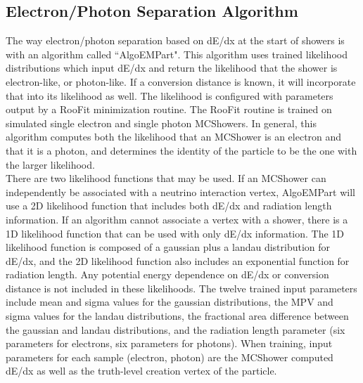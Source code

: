 \subsection{Electron/Photon Separation Algorithm}\label{algoempart_section}
The way electron/photon separation based on dE/dx at the start of showers is with an algorithm called ``AlgoEMPart". This algorithm uses trained likelihood distributions which input dE/dx and return the likelihood that the shower is electron-like, or photon-like. If a conversion distance is known, it will incorporate that into its likelihood as well. The likelihood is configured with parameters output by a RooFit minimization routine. The RooFit routine is trained on simulated single electron and single photon {\sc MCShowers}. In general, this algorithm computes both the likelihood that an {\sc MCShower} is an electron and that it is a photon, and determines the identity of the particle to be the one with the larger likelihood.\\

There are two likelihood functions that may be used. If an {\sc MCShower} can independently be associated with a neutrino interaction vertex, AlgoEMPart will use a 2D likelihood function that includes both dE/dx and radiation length information. If an algorithm cannot associate a vertex with a shower, there is a 1D likelihood function that can be used with only dE/dx information. The 1D likelihood function is composed of a gaussian plus a landau distribution for dE/dx, and the 2D likelihood function also includes an exponential function for radiation length. Any potential energy dependence on dE/dx or conversion distance is not included in these likelihoods. The twelve trained input parameters include mean and sigma values for the gaussian distributions, the MPV and sigma values for the landau distributions, the fractional area difference between the gaussian and landau distributions, and the radiation length parameter (six parameters for electrons, six parameters for photons). When training, input parameters for each sample (electron, photon) are the {\sc MCShower} computed dE/dx as well as the truth-level creation vertex of the particle.

